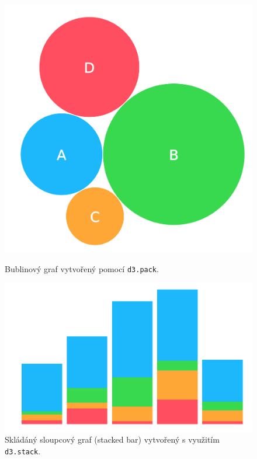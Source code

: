 \documentclass[
  digital, %
  oneside, %
  table,   %
  nolof,     %
  nolot,     %
]{fithesis3}
\begin{document}
\begin{figure}[H]
  \RawFloats
  \centering
  \begin{minipage}[b]{0.35\textwidth}
  	\centering
    \includegraphics[width=\textwidth]{images/bubble.pdf}
    \caption{Bublinový graf vytvořený pomocí \texttt{d3.pack}.}
    \label{fig:bubbleChart}
  \end{minipage}
  \hfill
  \begin{minipage}[b]{0.5\textwidth}
    \includegraphics[width=\textwidth]{images/stack.pdf}
    \caption{Skládáný sloupcový graf (stacked bar) vytvořený s využitím \texttt{d3.stack}.}
    \label{fig:stackBarChart}
  \end{minipage}
\end{figure}
\end{document}
